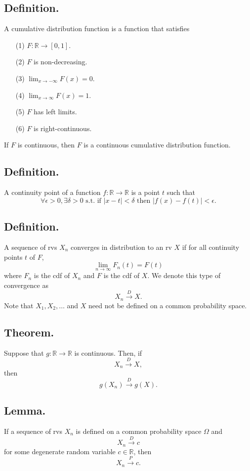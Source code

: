 \documentclass[titlepage]{article}
\begin{document}
\subsection{Definition.} A cumulative distribution function is a function that satisfies 
\begin{enumerate}
\item[(1)] $F: \mathbb{R} \to [0, 1]$.
\item[(2)] $F$ is non-decreasing.
\item[(3)] $\lim_{x \to -\infty}F(x) = 0$.
\item[(4)] $\lim_{x \to \infty}F(x) = 1$.
\item[(5)] $F$ has left limits.
\item[(6)] $F$ is right-continuous.
\end{enumerate}
If $F$ is continuous, then $F$ is a continuous cumulative distribution function.

\subsection{Definition.} A continuity point of a function $f: \mathbb{R} \to \mathbb{R}$ is a point $t$ such that 
$$\forall \epsilon > 0, \exists \delta > 0 \text{ s.t. if } |x - t| < \delta \text{ then } |f(x) - f(t)| < \epsilon.$$

\subsection{Definition.} A sequence of rvs $X_{n}$ converges in distribution to an rv $X$ if for all continuity points $t$ of $F$, 
$$\lim_{n \to \infty}F_{n}(t) = F(t)$$
where $F_{n}$ is the cdf of $X_{n}$ and $F$ is the cdf of $X$.
We denote this type of convergence as
$$X_{n} \xrightarrow{D} X.$$
Note that $X_{1}, X_{2}, \ldots$ and $X$ need not be defined on a common probability space.

\subsection{Theorem.} Suppose that $g: \mathbb{R} \to \mathbb{R}$ is continuous. Then, if 
$$X_{n} \xrightarrow{D} X,$$
then
$$g(X_{n}) \xrightarrow{D} g(X).$$

\subsection{Lemma.} If a sequence of rvs $X_{n}$ is defined on a common probability space $\Omega$ and 
$$X_{n} \xrightarrow{D} c$$
for some degenerate random variable $c \in \mathbb{R}$, then 
$$X_{n} \xrightarrow{P} c.$$
\end{document}
